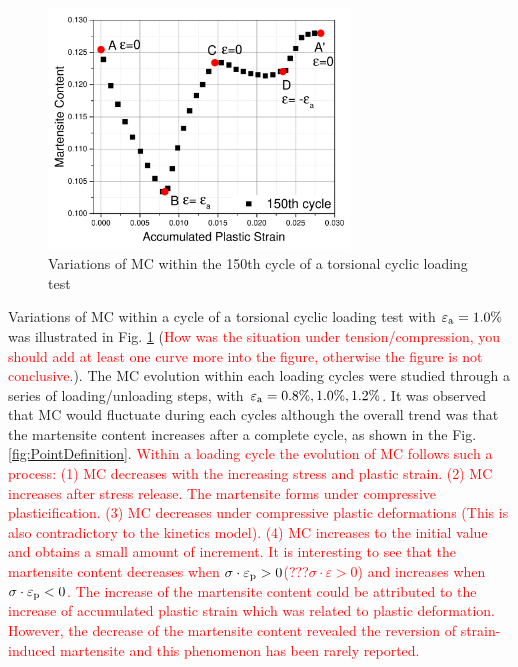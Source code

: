 \documentclass[final,5p,times,onecolumn,10pt,sort&compress]{elsarticle}
\newcommand{\marked}[1]{\textcolor{red}{#1}}
\begin{document}
\begin{figure}[!h]
  \begin{center}
  \includegraphics[width=8cm]{MCvariation.pdf}
  \caption{Variations of MC within the 150th cycle of a torsional cyclic loading test}
  \label{fig:Variations of martensite content}
  \end{center}
\end{figure}


Variations of  MC within a cycle of a torsional cyclic loading test with $\varepsilon_{\rm a}=1.0\%$ was illustrated in Fig. \ref{fig:Variations of martensite content} (\marked{How was the situation under tension/compression, you should add at least one curve more into the figure, otherwise the figure is not conclusive.}).
The MC evolution within each loading cycles were studied through a series of loading/unloading steps, with $\varepsilon_{\rm a}=0.8\%,1.0\%,1.2\%$. It was observed that  MC would fluctuate during each cycles although the overall trend was that the martensite content increases after a complete cycle, as shown in the Fig. \ref{fig:PointDefinition}.
\marked{Within a loading cycle the evolution of MC follows such a process: (1) MC decreases with the increasing stress and plastic strain. (2) MC increases after stress release. The martensite forms under compressive plasticification. (3) MC decreases under compressive plastic deformations \marked{(This is also contradictory to the kinetics model)}.  (4) MC increases to the initial value and obtains a small amount of increment. It is interesting to see that the martensite content decreases when $\sigma \cdot \varepsilon_{\rm p} > 0$(???$\sigma \cdot \varepsilon > 0$)  and increases when  $\sigma \cdot \varepsilon_{\rm p}<0$. The increase of the martensite content could be attributed to the increase of accumulated plastic strain which was related to plastic deformation. However, the decrease of the martensite content revealed the reversion of strain-induced martensite and this phenomenon has been rarely reported. }
\end{document}
